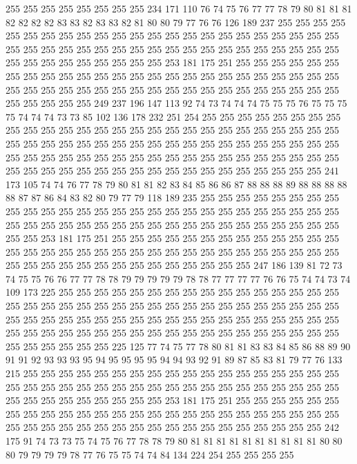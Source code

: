 255 255 255 255 255 255 255 255 234 171 110 76 74 75 76 77 77 78 79 80
81 81 81 82 82 82 82 83 83 82 83 83 82 81 80 80 79 77 76 76
126 189 237 255 255 255 255 255 255 255 255 255 255 255 255 255 255 255 255 255
255 255 255 255 255 255 255 255 255 255 255 255 255 255 255 255 255 255 255 255
255 255 255 255 255 255 255 255 255 255 255 255 255 255 253 181 175 251 255 255
255 255 255 255 255 255 255 255 255 255 255 255 255 255 255 255 255 255 255 255
255 255 255 255 255 255 255 255 255 255 255 255 255 255 255 255 255 255 255 255
255 255 255 255 255 255 255 249 237 196 147 113 92 74 73 74 74 74 75 75
75 76 75 75 75 75 74 74 74 73 73 85 102 136 178 232 251 254 255 255
255 255 255 255 255 255 255 255 255 255 255 255 255 255 255 255 255 255 255 255
255 255 255 255 255 255 255 255 255 255 255 255 255 255 255 255 255 255 255 255
255 255 255 255 255 255 255 255 255 255 255 255 255 255 255 255 255 255 255 255
255 255 255 255 255 255 255 255 255 255 255 255 255 255 255 255 255 255 255 255
255 241 173 105 74 74 76 77 78 79 80 81 81 82 83 84 85 86 86 87
88 88 88 89 88 88 88 88 88 87 87 86 84 83 82 80 79 77 79 118
189 235 255 255 255 255 255 255 255 255 255 255 255 255 255 255 255 255 255 255
255 255 255 255 255 255 255 255 255 255 255 255 255 255 255 255 255 255 255 255
255 255 255 255 255 255 255 255 255 255 253 181 175 251 255 255 255 255 255 255
255 255 255 255 255 255 255 255 255 255 255 255 255 255 255 255 255 255 255 255
255 255 255 255 255 255 255 255 255 255 255 255 255 255 255 255 255 255 255 255
247 186 139 81 72 73 74 75 75 76 76 77 77 78 78 79 79 79 79 79
78 78 77 77 77 77 76 76 75 74 74 73 74 109 173 225 255 255 255 255
255 255 255 255 255 255 255 255 255 255 255 255 255 255 255 255 255 255 255 255
255 255 255 255 255 255 255 255 255 255 255 255 255 255 255 255 255 255 255 255
255 255 255 255 255 255 255 255 255 255 255 255 255 255 255 255 255 255 255 255
255 255 255 255 255 255 255 255 255 255 255 255 255 255 255 225 125 77 74 75
77 78 80 81 81 83 83 84 85 86 88 89 90 91 91 92 93 93 93 95
94 95 95 95 95 94 94 93 92 91 89 87 85 83 81 79 77 76 133 215
255 255 255 255 255 255 255 255 255 255 255 255 255 255 255 255 255 255 255 255
255 255 255 255 255 255 255 255 255 255 255 255 255 255 255 255 255 255 255 255
255 255 255 255 255 255 253 181 175 251 255 255 255 255 255 255 255 255 255 255
255 255 255 255 255 255 255 255 255 255 255 255 255 255 255 255 255 255 255 255
255 255 255 255 255 255 255 255 255 255 255 255 255 242 175 91 74 73 73 75
74 75 76 77 78 78 79 80 81 81 81 81 81 81 81 81 81 81 80 80
80 79 79 79 79 78 77 76 75 75 74 74 84 134 224 254 255 255 255 255
